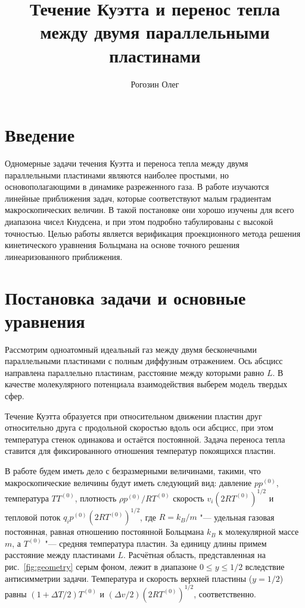 \documentclass[a4paper,12pt]{article}
\title{Течение Куэтта и перенос тепла между двумя параллельными пластинами}
\author{Рогозин Олег}
\begin{document}
\maketitle
\tableofcontents

\section{Введение}

Одномерные задачи течения Куэтта и переноса тепла между двумя параллельными пластинами являются наиболее простыми,
но основополагающими в динамике разреженного газа. В работе изучаются линейные приближения задач,
которые соответствуют малым градиентам макроскопических величин. В такой постановке они хорошо изучены
для всего диапазона чисел Кнудсена, и при этом подробно табулированы с высокой точностью.
Целью работы является верификация проекционного метода решения кинетического уравнения Больцмана
на основе точного решения линеаризованного приближения.

\section{Постановка задачи и основные уравнения}

Рассмотрим одноатомный идеальный газ между двумя бесконечными параллельными пластинами с полным диффузным отражением.
Ось абсцисс направлена параллельно пластинам, расстояние между которыми равно \(L\).
В качестве молекулярного потенциала взаимодействия выберем модель твердых сфер.

Течение Куэтта образуется при относительном движении пластин друг относительно друга с продольной скоростью
вдоль оси абсцисс, при этом температура стенок одинакова и остаётся постоянной.
Задача переноса тепла ставится для фиксированного отношения температур покоящихся пластин.

В работе будем иметь дело с безразмерными величинами, такими, что макроскопические величины будут
иметь следующий вид: давление \(pp^{(0)}\), температура \(TT^{(0)}\), плотность \(\rho p^{(0)}/RT^{(0)}\)
скорость \(v_i(2RT^{(0)})^{1/2}\) и тепловой поток \(q_ip^{(0)}(2RT^{(0)})^{1/2}\),
где \(R = k_B/m\) "--- удельная газовая постоянная,
равная отношению постоянной Больцмана \(k_B\) к молекулярной массе \(m\),
а \(T^{(0)}\) "--- средняя температура пластин.
За единицу длины примем расстояние между пластинами \(L\).
Расчётная область, представленная на рис.~\ref{fig:geometry} серым фоном,
лежит в диапазоне \(0 \le y\le 1/2\) вследствие антисимметрии задачи.
Температура и скорость верхней пластины (\(y=1/2\)) равны \((1+\Delta{T}/2)T^{(0)}\)
и \((\Delta{v}/2)(2RT^{(0)})^{1/2}\), соответственно.
\end{document}
